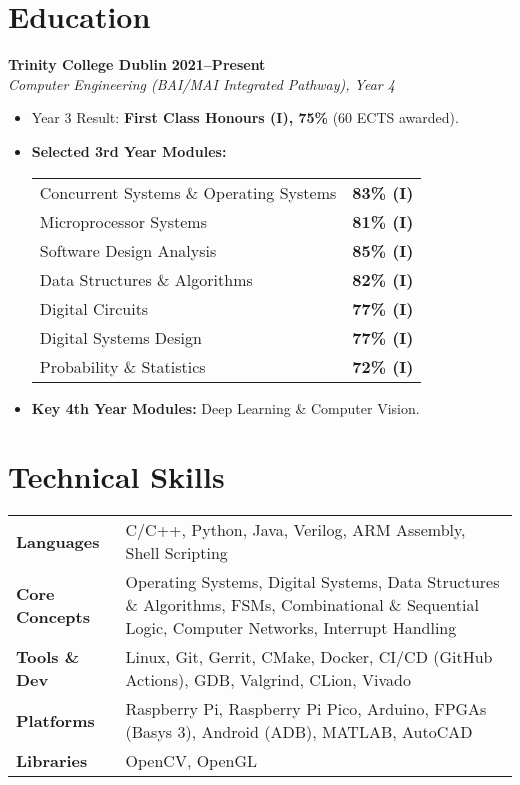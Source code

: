 \documentclass[10pt,a4paper]{article}
\begin{document}
\section*{Education}
\textbf{Trinity College Dublin} \hfill \textbf{2021--Present} \\
\textit{Computer Engineering (BAI/MAI Integrated Pathway), Year 4}
\begin{itemize}
    \item Year 3 Result: \textbf{First Class Honours (I), 75\%} (60 ECTS awarded).
    \item \textbf{Selected 3rd Year Modules:} \\
        \begin{tabularx}{\linewidth}{@{} X r @{}}
            Concurrent Systems \& Operating Systems & \textbf{83\% (I)} \\
            Microprocessor Systems & \textbf{81\% (I)} \\
            Software Design Analysis & \textbf{85\% (I)} \\
            Data Structures \& Algorithms & \textbf{82\% (I)} \\
            Digital Circuits & \textbf{77\% (I)} \\
            Digital Systems Design & \textbf{77\% (I)} \\
            Probability \& Statistics & \textbf{72\% (I)} \\
        \end{tabularx}
    \item \textbf{Key 4th Year Modules:} Deep Learning \& Computer Vision.
\end{itemize}


\section*{Technical Skills}
\begin{tabularx}{\textwidth}{@{} l >{\raggedright\arraybackslash}X @{}}
    \textbf{Languages}      & C/C++, Python, Java, Verilog, ARM Assembly, Shell Scripting \\
    \textbf{Core Concepts}  & Operating Systems, Digital Systems, Data Structures \& Algorithms, FSMs, Combinational \& Sequential Logic, Computer Networks, Interrupt Handling \\
    \textbf{Tools \& Dev}   & Linux, Git, Gerrit, CMake, Docker, CI/CD (GitHub Actions), GDB, Valgrind, CLion, Vivado \\
    \textbf{Platforms}      & Raspberry Pi, Raspberry Pi Pico, Arduino, FPGAs (Basys 3), Android (ADB), MATLAB, AutoCAD \\
    \textbf{Libraries}      & OpenCV, OpenGL \\
\end{tabularx}
\end{document}
